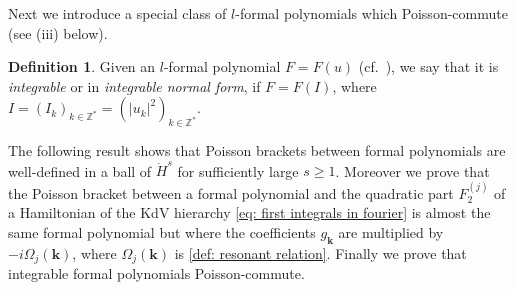 \documentclass[a4paper,10pt,reqno]{article}
\theoremstyle{definition}
\newtheorem{definition}{Definition}[section]
\theoremstyle{plain}
\theoremstyle{plain}
\theoremstyle{definition}
\theoremstyle{plain}
\theoremstyle{plain}
\theoremstyle{plain}
\theoremstyle{definition}
\theoremstyle{definition}
\def \Z{\mathbb Z}
\def \k{\bm{k}}
\begin{document}
Next we introduce a special class of $l$-formal polynomials which Poisson-commute (see  (iii) below).

\begin{definition} \label{def: functions in normal form}
Given an $l$-formal polynomial  $F = F(u)$ (cf.~), we say that it is \emph{integrable} or in \textit{integrable normal form}, if $F = F(I)$, where $I = (I_k)_{k\in\Z^*} = (|u_k|^2)_{k\in\Z^*}.$ 
\end{definition}



The following result shows that Poisson brackets between formal polynomials are well-defined in a ball of $\dot{H}^s$ for sufficiently large $s\geq 1$. 
Moreover we prove that the Poisson bracket between a formal polynomial and the quadratic part $F_2^{(j)}$ of a Hamiltonian of the KdV hierarchy \eqref{eq: first integrals in fourier} is almost the same formal polynomial but where the coefficients $g_{\k}$ are multiplied by $-i \Omega_{j}(\k)$, where $\Omega_j(\k)$ is \eqref{def: resonant relation}.
Finally we prove that integrable formal polynomials Poisson-commute.
\end{document}
